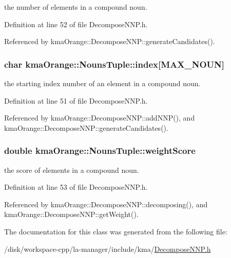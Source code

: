 the number of elements in a compound noun. 



Definition at line 52 of file DecomposeNNP.h.

Referenced by kmaOrange::DecomposeNNP::generateCandidates().\hypertarget{classkmaOrange_1_1NounsTuple_edb080ce36e388b3bf17f633efba884b}{
\subsubsection[{index}]{\setlength{\rightskip}{0pt plus 5cm}char {\bf kmaOrange::NounsTuple::index}\mbox{[}MAX\_\-NOUN\mbox{]}}}
\label{classkmaOrange_1_1NounsTuple_edb080ce36e388b3bf17f633efba884b}


the starting index number of an element in a compound noun. 



Definition at line 51 of file DecomposeNNP.h.

Referenced by kmaOrange::DecomposeNNP::addNNP(), and kmaOrange::DecomposeNNP::generateCandidates().\hypertarget{classkmaOrange_1_1NounsTuple_5a1fe5e0bf3d38a3ad61d0894c03f4f3}{
\subsubsection[{weightScore}]{\setlength{\rightskip}{0pt plus 5cm}double {\bf kmaOrange::NounsTuple::weightScore}}}
\label{classkmaOrange_1_1NounsTuple_5a1fe5e0bf3d38a3ad61d0894c03f4f3}


the score of elements in a compound noun. 



Definition at line 53 of file DecomposeNNP.h.

Referenced by kmaOrange::DecomposeNNP::decomposing(), and kmaOrange::DecomposeNNP::getWeight().

The documentation for this class was generated from the following file:\begin{CompactItemize}
\item 
/disk/workspace-cpp/la-manager/include/kma/\hyperlink{DecomposeNNP_8h}{DecomposeNNP.h}\end{CompactItemize}

